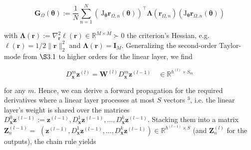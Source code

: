 \documentclass[10pt]{article}
\begin{document}
\begin{equation*}
\boldsymbol{G}_{\Omega}(\boldsymbol{\theta}):=\frac{1}{N} \sum_{n=1}^{N}\left(\mathrm{~J}_{\boldsymbol{\theta}} \boldsymbol{r}_{\Omega, n}(\boldsymbol{\theta})\right)^{\top} \boldsymbol{\Lambda}\left(\boldsymbol{r}_{\Omega, n}\right)\left(\mathrm{J}_{\boldsymbol{\theta}} \boldsymbol{r}_{\Omega, n}(\boldsymbol{\theta})\right) \tag{12}
\end{equation*}


with $\boldsymbol{\Lambda}(\boldsymbol{r}):=\nabla_{\boldsymbol{r}}^{2} \ell(\boldsymbol{r}) \in \mathbb{R}^{M \times M} \succ 0$ the criterion's Hessian, e.g. $\ell(\boldsymbol{r})=1 / 2\|\boldsymbol{r}\|_{2}^{2}$ and $\boldsymbol{\Lambda}(\boldsymbol{r})=\boldsymbol{I}_{M}$. Generalizing the second-order Taylor-mode from $\S 3.1$ to higher orders for the linear layer, we find


\begin{equation*}
D_{\boldsymbol{x}}^{m} \boldsymbol{z}^{(l)}=\boldsymbol{W}^{(l)} D_{\boldsymbol{x}}^{m} \boldsymbol{z}^{(l-1)} \quad \in \mathbb{R}^{h^{(l)} \times S_{m}} \tag{13}
\end{equation*}


for any $m$. Hence, we can derive a forward propagation for the required derivatives where a linear layer processes at most $S$ vectors ${ }^{3}$, i.e. the linear layer's weight is shared over the matrices $D_{\boldsymbol{x}}^{0} \boldsymbol{z}^{(l-1)}:=\boldsymbol{z}^{(l-1)}, D_{\boldsymbol{x}}^{1} \boldsymbol{z}^{(l-1)}, \ldots, D_{\boldsymbol{x}}^{k} \boldsymbol{z}^{(l-1)}$. Stacking them into a matrix $\boldsymbol{Z}_{n}^{(l-1)}=$ $\left(\boldsymbol{z}^{(l-1)}, D_{\boldsymbol{x}}^{1} \boldsymbol{z}^{(l-1)}, \ldots, D_{\boldsymbol{x}}^{k} \boldsymbol{z}^{(l-1)}\right) \in \mathbb{R}^{h^{(l-1)} \times S}$ (and $\boldsymbol{Z}_{n}^{(l)}$ for the outputs), the chain rule yields
\end{document}
